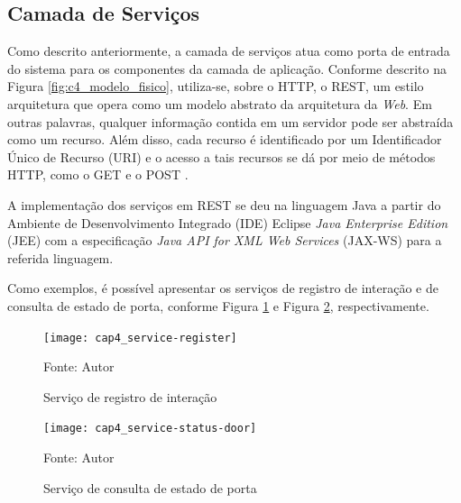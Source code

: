 
\subsection{Camada de Serviços}

Como descrito anteriormente, a camada de serviços atua como porta de entrada do sistema para os componentes da camada de aplicação. 
Conforme descrito na Figura \ref{fig:c4_modelo_fisico}, utiliza-se, sobre o HTTP, o REST, um estilo arquitetura que opera como um modelo abstrato da arquitetura da \textit{Web}. Em outras palavras, qualquer informação contida em um servidor pode ser abstraída como um recurso. Além disso, cada recurso é identificado por um Identificador Único de Recurso (URI) e o acesso a tais recursos se dá por meio de métodos HTTP, como o GET e o POST \cite{Fielding2000}.

A implementação dos serviços em REST se deu na linguagem Java a partir do Ambiente de Desenvolvimento Integrado (IDE) Eclipse \textit{Java Enterprise Edition} (JEE) com a especificação \textit{Java API for XML Web Services} (JAX-WS) para a referida linguagem.

Como exemplos, é possível apresentar os serviços de registro de interação e de consulta de estado de porta, conforme Figura \ref{fig:cap4_service-register} e Figura \ref{fig:cap4_service-status-door}, respectivamente.

\begin{figure}[htb]
    \caption{Serviço de registro de interação}
    \label{fig:cap4_service-register}
    \texttt{[image: cap4\_service-register]}
    
    \footnotesize{Fonte: Autor}
\end{figure}


\begin{figure}[htb]
    \caption{Serviço de consulta de estado de porta}
    \label{fig:cap4_service-status-door}
    \texttt{[image: cap4\_service-status-door]}
    
    \footnotesize{Fonte: Autor}
\end{figure}

